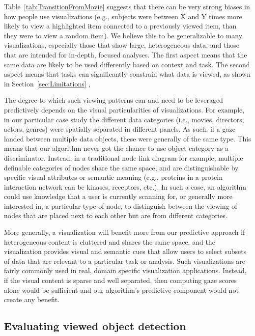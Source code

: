 Table~\ref{tab:TransitionFromMovie} suggests that there can be very strong biases in how people use visualizations (e.g., subjects were between X  and Y times  more likely to view a highlighted item connected to a previously viewed item, than they were to view a random item). We believe this to be generalizable to many visualizations, especially those that show large, heterogeneous data, and those that are intended for in-depth, focused analyses. The first aspect means that the same data are likely to be used differently based on context and task. The second aspect means that  tasks can significantly constrain what data is viewed, as shown in Section~\ref{sec:Limitations} ,   

The degree to which such viewing patterns can and need to be leveraged predictively depends on the visual particularities of visualizations. For example, in our particular case study the different data categories (i.e., movies, directors, actors, genres) were spatially separated in different panels. As such, if a gaze landed between multiple data objects, these were generally of the same type. This means that our algorithm never got the chance to use object category as a discriminator. Instead, in a traditional node link diagram for example, multiple definable categories of nodes share the same space, and are distinguishable by specific visual attributes or semantic meaning (e.g., proteins in a protein interaction network can be kinases, receptors, etc.). In such a case, an algorithm could use knowledge that a user is currently scanning for, or generally more interested in, a particular type of node, to distinguish between the viewing of nodes that are placed next to each other but are from different categories.  

More generally, a visualization will benefit more from our predictive approach if heterogeneous content is cluttered and shares the same space, and the visualization provides visual and semantic cues that allow users to select subsets of  data that are relevant to a particular task or analysis. Such visualizations are fairly commonly used in real, domain specific visualization applications. Instead, if the visual content is sparse and well separated, then computing gaze scores alone would be sufficient and our algorithm's predictive component would not create any benefit.



\subsection{Evaluating viewed object detection} 
\label{sec:DiscussionEvaluatingViewedObjectDetection}

